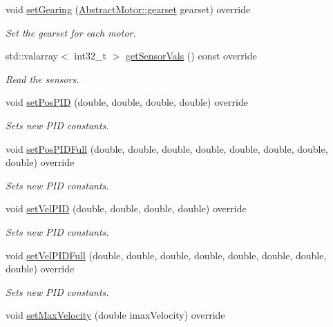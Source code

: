\begin{DoxyCompactItemize}
void \mbox{\hyperlink{classokapi_1_1MockChassisModel_a86cf41b7e6ac3e3a042434a6722dfe40}{set\+Gearing}} (\mbox{\hyperlink{classokapi_1_1AbstractMotor_a88aaa6ea2fa10f5520a537bbf26774d5}{Abstract\+Motor\+::gearset}} gearset) override
\begin{DoxyCompactList}\small\item\em Set the gearset for each motor. \end{DoxyCompactList}\item 
std\+::valarray$<$ int32\+\_\+t $>$ \mbox{\hyperlink{classokapi_1_1MockChassisModel_a9f380fec68c9a1b6c695989841b3f712}{get\+Sensor\+Vals}} () const override
\begin{DoxyCompactList}\small\item\em Read the sensors. \end{DoxyCompactList}\item 
void \mbox{\hyperlink{classokapi_1_1MockChassisModel_af485c125959b578593f7be122abaecf0}{set\+Pos\+P\+ID}} (double, double, double, double) override
\begin{DoxyCompactList}\small\item\em Sets new P\+ID constants. \end{DoxyCompactList}\item 
void \mbox{\hyperlink{classokapi_1_1MockChassisModel_af5072f2a8e7f29ef075ed617ee91698f}{set\+Pos\+P\+I\+D\+Full}} (double, double, double, double, double, double, double, double) override
\begin{DoxyCompactList}\small\item\em Sets new P\+ID constants. \end{DoxyCompactList}\item 
void \mbox{\hyperlink{classokapi_1_1MockChassisModel_a9ceacb2d576b038e7829bf268b54331b}{set\+Vel\+P\+ID}} (double, double, double, double) override
\begin{DoxyCompactList}\small\item\em Sets new P\+ID constants. \end{DoxyCompactList}\item 
void \mbox{\hyperlink{classokapi_1_1MockChassisModel_aed3bdad43d0b2416504eadd2669d0185}{set\+Vel\+P\+I\+D\+Full}} (double, double, double, double, double, double, double, double) override
\begin{DoxyCompactList}\small\item\em Sets new P\+ID constants. \end{DoxyCompactList}\item 
void \mbox{\hyperlink{classokapi_1_1MockChassisModel_ac3dcc46422466c8682cc8bc948535d7b}{set\+Max\+Velocity}} (double imax\+Velocity) override

\end{DoxyCompactItemize}

